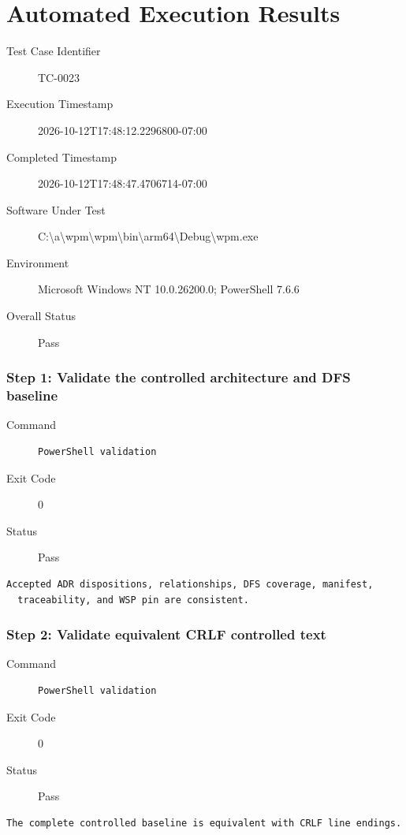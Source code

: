 \section*{Automated Execution Results}
\begin{description}
\item[Test Case Identifier] TC-0023
\item[Execution Timestamp] 2026-10-12T17:48:12.2296800-07:00
\item[Completed Timestamp] 2026-10-12T17:48:47.4706714-07:00
\item[Software Under Test] C:\textbackslash{}a\textbackslash{}wpm\textbackslash{}wpm\textbackslash{}bin\textbackslash{}arm64\textbackslash{}Debug\textbackslash{}wpm.exe
\item[Environment] Microsoft Windows NT 10.0.26200.0; PowerShell 7.6.6
\item[Overall Status] Pass
\end{description}
\subsubsection*{Step 1: Validate the controlled architecture and DFS baseline}
\begin{description}
\item[Command] \mbox{}
\begin{verbatim}
PowerShell validation
\end{verbatim}
\item[Exit Code] 0
\item[Status] Pass
\end{description}
\begin{verbatim}
Accepted ADR dispositions, relationships, DFS coverage, manifest,
  traceability, and WSP pin are consistent.
\end{verbatim}
\subsubsection*{Step 2: Validate equivalent CRLF controlled text}
\begin{description}
\item[Command] \mbox{}
\begin{verbatim}
PowerShell validation
\end{verbatim}
\item[Exit Code] 0
\item[Status] Pass
\end{description}
\begin{verbatim}
The complete controlled baseline is equivalent with CRLF line endings.
\end{verbatim}
